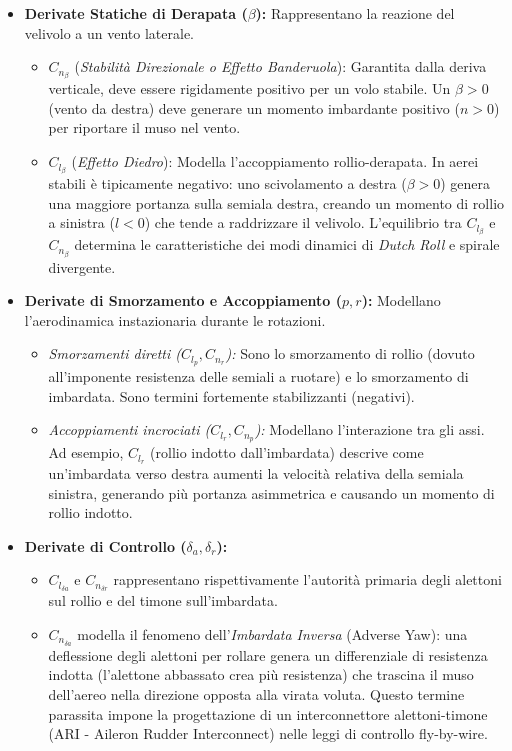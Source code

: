 \begin{itemize}
	\item \textbf{Derivate Statiche di Derapata ($\beta$):} Rappresentano la reazione del velivolo a un vento laterale. 
	\begin{itemize}
		\item $C_{n_\beta}$ (\textit{Stabilità Direzionale o Effetto Banderuola}): Garantita dalla deriva verticale, deve essere rigidamente positivo per un volo stabile. Un $\beta > 0$ (vento da destra) deve generare un momento imbardante positivo ($n > 0$) per riportare il muso nel vento.
		\item $C_{l_\beta}$ (\textit{Effetto Diedro}): Modella l'accoppiamento rollio-derapata. In aerei stabili è tipicamente negativo: uno scivolamento a destra ($\beta > 0$) genera una maggiore portanza sulla semiala destra, creando un momento di rollio a sinistra ($l < 0$) che tende a raddrizzare il velivolo. L'equilibrio tra $C_{l_\beta}$ e $C_{n_\beta}$ determina le caratteristiche dei modi dinamici di \textit{Dutch Roll} e spirale divergente.
	\end{itemize}
	
	\item \textbf{Derivate di Smorzamento e Accoppiamento ($p, r$):} Modellano l'aerodinamica instazionaria durante le rotazioni. 
	\begin{itemize}
		\item \textit{Smorzamenti diretti ($C_{l_p}, C_{n_r}$):} Sono lo smorzamento di rollio (dovuto all'imponente resistenza delle semiali a ruotare) e lo smorzamento di imbardata. Sono termini fortemente stabilizzanti (negativi).
		\item \textit{Accoppiamenti incrociati ($C_{l_r}, C_{n_p}$):} Modellano l'interazione tra gli assi. Ad esempio, $C_{l_r}$ (rollio indotto dall'imbardata) descrive come un'imbardata verso destra aumenti la velocità relativa della semiala sinistra, generando più portanza asimmetrica e causando un momento di rollio indotto.
	\end{itemize}
	
	\item \textbf{Derivate di Controllo ($\delta_a, \delta_r$):}
	\begin{itemize}
		\item $C_{l_{\delta a}}$ e $C_{n_{\delta r}}$ rappresentano rispettivamente l'autorità primaria degli alettoni sul rollio e del timone sull'imbardata.
		\item $C_{n_{\delta a}}$ modella il fenomeno dell'\textit{Imbardata Inversa} (Adverse Yaw): una deflessione degli alettoni per rollare genera un differenziale di resistenza indotta (l'alettone abbassato crea più resistenza) che trascina il muso dell'aereo nella direzione opposta alla virata voluta. Questo termine parassita impone la progettazione di un interconnettore alettoni-timone (ARI - Aileron Rudder Interconnect) nelle leggi di controllo fly-by-wire.
	\end{itemize}
\end{itemize}


